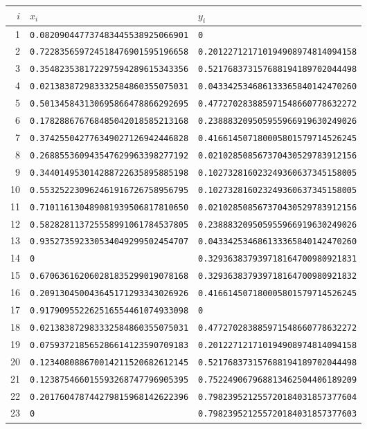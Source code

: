 \begin{center}\footnotesize
\begin{tabular}{@{}rll@{}}
\toprule
$i$ & $x_i$ & $y_i$\\
\midrule
1 & \texttt{0.082090447737483445538925066901} & \texttt{0}\\
2 & \texttt{0.722835659724518476901595196658} & \texttt{0.201227121710194908974814094158}\\
3 & \texttt{0.354823538172297594289615343356} & \texttt{0.521768373157688194189702044498}\\
4 & \texttt{0.021383872983332584860355075031} & \texttt{0.043342534686133365840142470260}\\
5 & \texttt{0.501345843130695866478866292695} & \texttt{0.477270283885971548660778632272}\\
6 & \texttt{0.178288676768485042018585213168} & \texttt{0.238883209505955966919630249026}\\
7 & \texttt{0.374255042776349027126942446828} & \texttt{0.416614507180005801579714526245}\\
8 & \texttt{0.268855360943547629963398277192} & \texttt{0.021028508567370430529783912156}\\
9 & \texttt{0.344014953014288722635895885198} & \texttt{0.102732816023249360637345158005}\\
10 & \texttt{0.553252230962461916726758956795} & \texttt{0.102732816023249360637345158005}\\
11 & \texttt{0.710116130489081939506817810650} & \texttt{0.021028508567370430529783912156}\\
12 & \texttt{0.582828113725558991061784537805} & \texttt{0.238883209505955966919630249026}\\
13 & \texttt{0.935273592330534049299502454707} & \texttt{0.043342534686133365840142470260}\\
14 & \texttt{0} & \texttt{0.329363837939718164700980921831}\\
15 & \texttt{0.670636162060281835299019078168} & \texttt{0.329363837939718164700980921832}\\
16 & \texttt{0.209130450043645171293343026926} & \texttt{0.416614507180005801579714526245}\\
17 & \texttt{0.917909552262516554461074933098} & \texttt{0}\\
18 & \texttt{0.021383872983332584860355075031} & \texttt{0.477270283885971548660778632272}\\
19 & \texttt{0.075937218565286614123590709183} & \texttt{0.201227121710194908974814094158}\\
20 & \texttt{0.123408088670014211520682612145} & \texttt{0.521768373157688194189702044498}\\
21 & \texttt{0.123875466015593268747796905395} & \texttt{0.752249067968813462504406189209}\\
22 & \texttt{0.201760478744279815968142622396} & \texttt{0.798239521255720184031857377604}\\
23 & \texttt{0} & \texttt{0.798239521255720184031857377603}\\
\bottomrule
\end{tabular}
\end{center}

